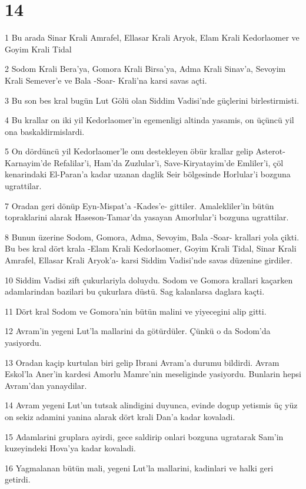 \chapter{14}

\par 1 Bu arada Sinar Krali Amrafel, Ellasar Krali Aryok, Elam Krali Kedorlaomer ve Goyim Krali Tidal
\par 2 Sodom Krali Bera'ya, Gomora Krali Birsa'ya, Adma Krali Sinav'a, Sevoyim Krali Semever'e ve Bala -Soar- Krali'na karsi savas açti.
\par 3 Bu son bes kral bugün Lut Gölü olan Siddim Vadisi'nde güçlerini birlestirmisti.
\par 4 Bu krallar on iki yil Kedorlaomer'in egemenligi altinda yasamis, on üçüncü yil ona baskaldirmislardi.
\par 5 On dördüncü yil Kedorlaomer'le onu destekleyen öbür krallar gelip Asterot-Karnayim'de Refalilar'i, Ham'da Zuzlular'i, Save-Kiryatayim'de Emliler'i, çöl kenarindaki El-Paran'a kadar uzanan daglik Seir bölgesinde Horlular'i bozguna ugrattilar.
\par 7 Oradan geri dönüp Eyn-Mispat'a -Kades'e- gittiler. Amalekliler'in bütün topraklarini alarak Haseson-Tamar'da yasayan Amorlular'i bozguna ugrattilar.
\par 8 Bunun üzerine Sodom, Gomora, Adma, Sevoyim, Bala -Soar- krallari yola çikti. Bu bes kral dört krala -Elam Krali Kedorlaomer, Goyim Krali Tidal, Sinar Krali Amrafel, Ellasar Krali Aryok'a- karsi Siddim Vadisi'nde savas düzenine girdiler.
\par 10 Siddim Vadisi zift çukurlariyla doluydu. Sodom ve Gomora krallari kaçarken adamlarindan bazilari bu çukurlara düstü. Sag kalanlarsa daglara kaçti.
\par 11 Dört kral Sodom ve Gomora'nin bütün malini ve yiyecegini alip gitti.
\par 12 Avram'in yegeni Lut'la mallarini da götürdüler. Çünkü o da Sodom'da yasiyordu.
\par 13 Oradan kaçip kurtulan biri gelip Ibrani Avram'a durumu bildirdi. Avram Eskol'la Aner'in kardesi Amorlu Mamre'nin meseliginde yasiyordu. Bunlarin hepsi Avram'dan yanaydilar.
\par 14 Avram yegeni Lut'un tutsak alindigini duyunca, evinde dogup yetismis üç yüz on sekiz adamini yanina alarak dört krali Dan'a kadar kovaladi.
\par 15 Adamlarini gruplara ayirdi, gece saldirip onlari bozguna ugratarak Sam'in kuzeyindeki Hova'ya kadar kovaladi.
\par 16 Yagmalanan bütün mali, yegeni Lut'la mallarini, kadinlari ve halki geri getirdi.
